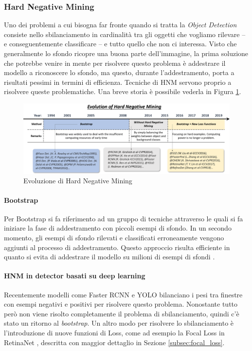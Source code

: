 \subsubsection{Hard Negative Mining}
Uno dei problemi a cui bisogna far fronte quando si tratta la \textit{Object Detection} consiste nello sbilanciamento in cardinalità tra gli oggetti che vogliamo rilevare -- e conseguentemente classificare -- e tutto quello che non ci interessa. Visto che generalmente lo sfondo ricopre una buona parte dell'immagine, la prima soluzione che potrebbe venire in mente per risolvere questo problema è addestrare il modello a riconoscere lo sfondo, ma questo, durante l'addestramento, porta a risultati pessimi in termini di efficienza. Tecniche di \ac{HNM} servono proprio a risolvere queste problematiche. Una breve storia è possibile vederla in Figura \ref{fig:HNM_history}.
\begin{figure}
    \centering
    \includegraphics[width=\textwidth]{images/evol-hardnegmining.png}
    \caption{Evoluzione di Hard Negative Mining \cite{DBLP:journals/corr/abs-1905-05055}}
    \label{fig:HNM_history}
\end{figure}
\paragraph{Bootstrap}
Per Bootstrap si fa riferimento ad un gruppo di tecniche attraverso le quali si fa iniziare la fase di addestramento con piccoli esempi di sfondo. 
In un secondo momento, gli esempi di sfondo rilevati e classificati erroneamente vengono aggiunti al processo di addestramento. Questo approccio risulta efficiente in quanto si evita di addestrare il modello su milioni di esempi di sfondi \cite{viola2001rapid, papageorgiou1998general, rowley1996human}.
\paragraph{HNM in detector basati su deep learning}
Recentemente modelli come Faster RCNN e \ac{YOLO} bilanciano i pesi tra finestre con esempi negativi e positivi per risolvere questo problema. Nonostante tutto però non viene risolto completamente il problema di sbilanciamento, quindi c'è stato un ritorno al \textit{bootstrap}. Un altro modo per risolvere lo sbilanciamento è l'introduzione di nuove funzioni di Loss, come ad esempio la Focal Loss in RetinaNet \cite{lin2017focal}, descritta con maggior dettaglio in Sezione \ref{subsec:focal_loss}. 




